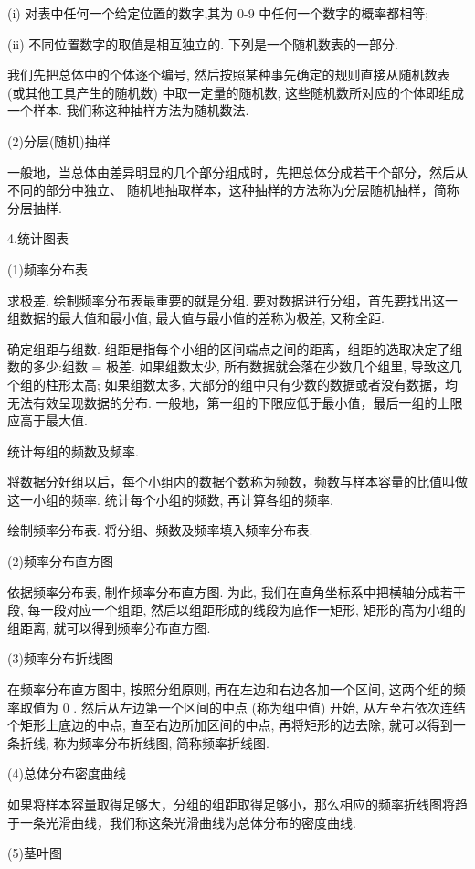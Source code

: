 (i) 对表中任何一个给定位置的数字,其为 0-9 中任何一个数字的概率都相等;

(ii) 不同位置数字的取值是相互独立的. 下列是一个随机数表的一部分.

我们先把总体中的个体逐个编号, 然后按照某种事先确定的规则直接从随机数表 (或其他工具产生的随机数) 中取一定量的随机数, 这些随机数所对应的个体即组成一个样本. 我们称这种抽样方法为随机数法.

(2)分层(随机)抽样

一般地，当总体由差异明显的几个部分组成时，先把总体分成若干个部分，然后从不同的部分中独立、 随机地抽取样本，这种抽样的方法称为分层随机抽样，简称分层抽样.

4.统计图表

(1)频率分布表

   求极差. 绘制频率分布表最重要的就是分组. 要对数据进行分组，首先要找出这一组数据的最大值和最小值, 最大值与最小值的差称为极差, 又称全距.

  确定组距与组数. 组距是指每个小组的区间端点之间的距离，组距的选取决定了组数的多少:组数 = 极差. 如果组数太少, 所有数据就会落在少数几个组里, 导致这几个组的柱形太高; 如果组数太多, 大部分的组中只有少数的数据或者没有数据，均无法有效呈现数据的分布. 一般地，第一组的下限应低于最小值，最后一组的上限应高于最大值.

  统计每组的频数及频率.

将数据分好组以后，每个小组内的数据个数称为频数，频数与样本容量的比值叫做这一小组的频率. 统计每个小组的频数, 再计算各组的频率.

  绘制频率分布表. 将分组、频数及频率填入频率分布表.

(2)频率分布直方图

依据频率分布表, 制作频率分布直方图. 为此, 我们在直角坐标系中把横轴分成若干段, 每一段对应一个组距, 然后以组距形成的线段为底作一矩形, 矩形的高为小组的组距离, 就可以得到频率分布直方图.

(3)频率分布折线图

在频率分布直方图中, 按照分组原则, 再在左边和右边各加一个区间, 这两个组的频率取值为 0 . 然后从左边第一个区间的中点 (称为组中值) 开始, 从左至右依次连结个矩形上底边的中点, 直至右边所加区间的中点, 再将矩形的边去除, 就可以得到一条折线, 称为频率分布折线图, 简称频率折线图.

(4)总体分布密度曲线

如果将样本容量取得足够大，分组的组距取得足够小，那么相应的频率折线图将趋于一条光滑曲线，我们称这条光滑曲线为总体分布的密度曲线.

(5)茎叶图

